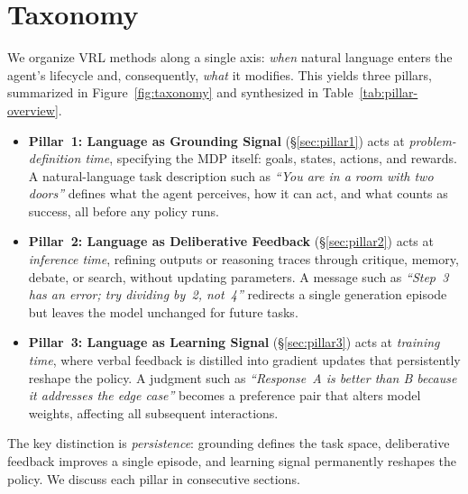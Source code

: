 \section{Taxonomy}
\label{sec:taxonomy}
We organize VRL methods along a single axis: \emph{when} natural language enters the agent's lifecycle and, consequently, \emph{what} it modifies. This yields three pillars, summarized in Figure~\ref{fig:taxonomy} and synthesized in Table~\ref{tab:pillar-overview}.

\begin{itemize}
    \setlength\itemsep{0.25em}
    \item \textbf{Pillar~1: Language as Grounding Signal} (\S\ref{sec:pillar1}) acts at \emph{problem-definition time}, specifying the MDP \citep{sutton1998reinforcement} itself: goals, states, actions, and rewards. A natural-language task description such as \textit{``You are in a room with two doors''} defines what the agent perceives, how it can act, and what counts as success, all before any policy runs.
    \item \textbf{Pillar~2: Language as Deliberative Feedback} (\S\ref{sec:pillar2}) acts at \emph{inference time}, refining outputs or reasoning traces through critique, memory, debate, or search, without updating parameters. A message such as \textit{``Step~3 has an error; try dividing by~2, not~4''} redirects a single generation episode but leaves the model unchanged for future tasks.
    \item \textbf{Pillar~3: Language as Learning Signal} (\S\ref{sec:pillar3}) acts at \emph{training time}, where verbal feedback is distilled into gradient updates that persistently reshape the policy. A judgment such as \textit{``Response~A is better than B because it addresses the edge case''} becomes a preference pair that alters model weights, affecting all subsequent interactions.
\end{itemize}

\noindent The key distinction is \emph{persistence}: grounding defines the task space, deliberative feedback improves a single episode, and learning signal permanently reshapes the policy. We discuss each pillar in consecutive sections. 

